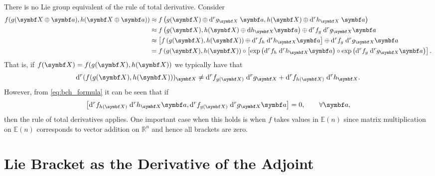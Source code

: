\begin{remark}
  \label{remark:total_derivative}
  There is no Lie group equivalent of the rule of total derivative. Consider
  \begin{equation}
    \begin{aligned}
      f(g(\X \oplus \a), h(\X \oplus \a))
       & \approx f \left( g(\X) \oplus \mathrm{d}^r g_\X \; \a , h(\X) \oplus \mathrm{d}^r h_\X \; \a \right)                                                                                      \\
       & \approx f \left( g(\X) , h(\X) \oplus \mathrm{d} h_\X \a \right) \oplus \mathrm{d}^r f_{g} \; \mathrm{d}^r g_\X \a                                                                        \\
       & \approx \left[ f \left( g(\X) , h(\X) \right) \oplus \mathrm{d}^r f_h \; \mathrm{d}^r h_\X \a \right] \oplus \mathrm{d}^r f_{g} \; \mathrm{d}^r g_\X \a                                   \\
       & =  f \left( g(\X) , h(\X) \right) \circ \left[ \exp\left( \mathrm{d}^r f_h \; \mathrm{d}^r h_\X \a  \right) \circ \exp\left ( \mathrm{d}^r f_{g} \; \mathrm{d}^r g_\X \a \right) \right].
    \end{aligned}
  \end{equation}
  That is, if $f(\X) = f(g(\X), h(\X))$ we typically have that
  \begin{equation}
    \mathrm{d}^r (f(g(\X), h(\X)))_\X  \neq  \mathrm{d}^r f_{g(\X)} \; \mathrm {d}^r g_\X + \mathrm{d}^r f_{h(\X)} \; \mathrm {d}^r h_\X.
  \end{equation}
  However, from \eqref{eq:bch_formula} it can be seen that if
  \begin{equation}
    \left[ \mathrm{d}^r f_{h(\X)} \; \mathrm{d}^r h_\X \a  ,   \mathrm{d}^r f_{g(\X)} \; \mathrm{d}^r g_\X \a  \right] = 0, \qquad \forall \a,
  \end{equation}
  then the rule of total derivatives applies. One important case when this holds is when $f$ takes values in $\mathbb{E}(n)$ since matrix multiplication on $\mathbb{E}(n)$ corresponds to vector addition on $\mathbb{R}^n$ and hence all brackets are zero.
\end{remark}

\section{Lie Bracket as the Derivative of the Adjoint}

